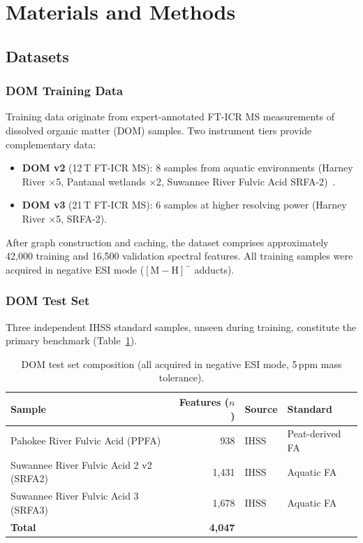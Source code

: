 \documentclass[journal=jcisd8]{achemso}
\begin{document}
\section{Materials and Methods}
\label{sec:methods}

\subsection{Datasets}

\subsubsection{DOM Training Data}

Training data originate from expert-annotated FT-ICR MS measurements of dissolved organic
matter (DOM) samples.  Two instrument tiers provide complementary data:

\begin{itemize}[nosep]
  \item \textbf{DOM v2} (12\,T FT-ICR MS): 8 samples from aquatic environments
    (Harney River $\times$5, Pantanal wetlands $\times$2, Suwannee River Fulvic Acid
    SRFA-2)~\cite{Stenson2003}.
  \item \textbf{DOM v3} (21\,T FT-ICR MS): 6 samples at higher resolving power
    (Harney River $\times$5, SRFA-2).
\end{itemize}

After graph construction and caching, the dataset comprises approximately 42,000 training
and 16,500 validation spectral features.  All training samples were acquired in negative ESI
mode ($[\text{M}-\text{H}]^-$ adducts).

\subsubsection{DOM Test Set}

Three independent IHSS standard samples, unseen during training, constitute the primary
benchmark (Table~\ref{tab:test_set}).

\begin{table}[H]
\centering
\small
\caption{DOM test set composition (all acquired in negative ESI mode, 5\,ppm mass tolerance).}
\label{tab:test_set}
\footnotesize
\begin{tabular}{lrll}
\toprule
\textbf{Sample} & \textbf{Features ($n$)} & \textbf{Source} & \textbf{Standard} \\
\midrule
Pahokee River Fulvic Acid (PPFA)        & 938   & IHSS & Peat-derived FA \\
Suwannee River Fulvic Acid 2 v2 (SRFA2) & 1{,}431 & IHSS & Aquatic FA \\
Suwannee River Fulvic Acid 3 (SRFA3)    & 1{,}678 & IHSS & Aquatic FA \\
\midrule
\textbf{Total}                            & \textbf{4{,}047} & & \\
\bottomrule
\end{tabular}
\end{table}
\end{document}
